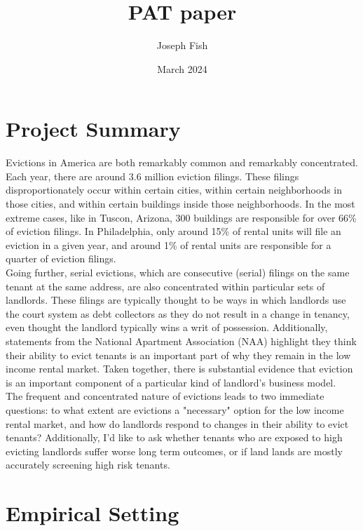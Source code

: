 \documentclass{article}
\title{PAT paper}
\author{Joseph Fish}
\date{March 2024}
\begin{document}
\section{Project Summary}

Evictions in America are both remarkably common and remarkably concentrated. Each year, there are around 3.6 million eviction filings. These filings disproportionately occur within certain cities, within certain neighborhoods in those cities, and within certain buildings inside those neighborhoods. In the most extreme cases, like in Tuscon, Arizona, 300 buildings are responsible for over 66\% of eviction filings. In Philadelphia, only around 15\% of rental units will file an eviction in a given year, and around 1\% of rental units are responsible for a quarter of eviction filings. \\

Going further, serial evictions, which are consecutive (serial) filings on the same tenant at the same address, are also concentrated within particular sets of landlords. These filings are typically thought to be ways in which landlords use the court system as debt collectors as they do not result in a change in tenancy, even thought the landlord typically wins a writ of possession. Additionally, statements from the National  Apartment Association (NAA) highlight they think their ability to evict tenants is an important part of why they remain in the low income rental market. Taken together, there is substantial evidence that eviction is an important component of a particular kind of landlord's business model. \\

The frequent and concentrated nature of evictions leads to two immediate questions: to what extent are evictions a "necessary" option for the low income rental market, and how do landlords respond to changes in their ability to evict tenants? Additionally, I'd like to ask whether tenants who are exposed to high evicting landlords suffer worse long term outcomes, or if land lands are mostly accurately screening high risk tenants.

\section{Empirical Setting}
\end{document}
